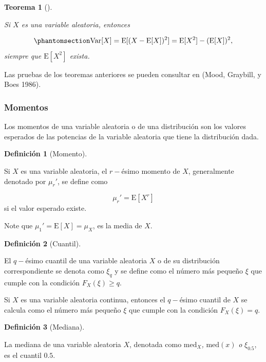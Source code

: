 \documentclass[
  us-letterpaper,
]{scrreprt}
\theoremstyle{plain}
\theoremstyle{definition}
\newtheorem{definition}{Definición}[chapter]
\theoremstyle{definition}
\theoremstyle{plain}
\newtheorem{theorem}{Teorema}[chapter]
\theoremstyle{remark}
\begin{document}
\begin{theorem}[]\protect\hypertarget{thm-var}{}\label{thm-var}

Si \(X\) es una variable aleatoria, entonces

\begin{equation}\phantomsection\label{eq-var}{\mathrm{Var}[X] = \mathrm E[(X-\mathrm E[X])^2] = \mathrm E[X^2] - (\mathrm E[X])^2,}\end{equation}
siempre que \(\mathrm E[X^2]\) exista.

\end{theorem}

Las pruebas de los teoremas anteriores se pueden consultar en (Mood,
Graybill, y Boes 1986).

\subsubsection{Momentos}\label{momentos}

Los momentos de una variable aleatoria o de una distribución son los
valores esperados de las potencias de la variable aleatoria que tiene la
distribución dada.

\begin{definition}[Momento]\protect\hypertarget{def-moment}{}\label{def-moment}

Si \(X\) es una variable aleatoria, el \(r-\)ésimo momento de \(X\),
generalmente denotado por \(\mu_r'\), se define como

\[ \mu_r'=\mathrm E[X^r] \] si el valor esperado existe.

\end{definition}

Note que \(\mu_1' = \mathrm E[X] = \mu_X\), es la media de \(X\).

\begin{definition}[Cuantil]\protect\hypertarget{def-quant}{}\label{def-quant}

El \(q-\)ésimo cuantil de una variable aleatoria \(X\) o de su
distribución correspondiente se denota como \(\xi_q\) y se define como
el número más pequeño \(\xi\) que cumple con la condición
\(F_X(\xi) \geq q\).

\end{definition}

Si \(X\) es una variable aleatoria continua, entonces el \(q-\)ésimo
cuantil de \(X\) se calcula como el número más pequeño \(\xi\) que
cumple con la condición \(F_X(\xi) = q\).

\begin{definition}[Mediana]\protect\hypertarget{def-median}{}\label{def-median}

La mediana de una variable aleatoria \(X\), denotada como
\(\mathrm{med}_X\)\emph{,} \(\mathrm{med}(x)\) \emph{o} \(\xi_{0.5}\),
es el cuantil \(0.5\).

\end{definition}
\end{document}
